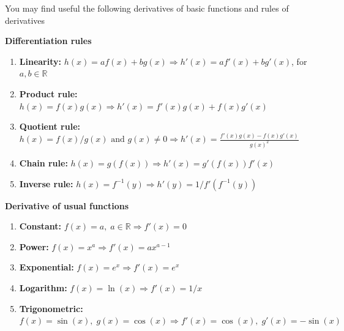 \documentclass[11pt]{exam}
\newcommand{\R}{\mathbb{R}} %
\begin{document}
\newpage
\begin{center}
You may find useful the following derivatives of basic functions and rules of derivatives
\end{center}

\begin{center}
    \textbf{Differentiation rules}
\end{center}
        
        \begin{enumerate}[leftmargin = 0.5cm, label = , rightmargin = 0.2cm]

        \item \textbf{Linearity:} $h(x) = a f(x) + b g(x) \Longrightarrow h'(x) = a f'(x) + b g'(x)$, for $a, b \in\R$

        \item \textbf{Product rule:} $h(x) = f(x)g(x) \Longrightarrow h'(x) = f'(x)g(x) + f(x)g'(x)$

        \item \textbf{Quotient rule:} $h(x) = f(x)/g(x) \text{ and } g(x) \neq 0 \Longrightarrow h'(x) = \frac{f'(x)g(x) - f(x)g'(x)}{g(x)^2}$

        \item \textbf{Chain rule:} $h(x) = g(f(x)) \Longrightarrow h'(x) = g'(f(x))f'(x)$

        \item \textbf{Inverse rule:} $h(x) = f^{-1}(y) \Longrightarrow h'(y) = 1/f'(f^{-1}(y))$
        
        \end{enumerate}

\begin{center}
    \textbf{Derivative of usual functions}
\end{center}

        \begin{enumerate}[leftmargin = 0.5cm, label = , rightmargin = 0.2cm]

        \item \textbf{Constant:} $f(x) = a,\; a \in\R \Longrightarrow f'(x) = 0$
        
        \item \textbf{Power:} $f(x) = x^a \Longrightarrow f'(x) = a x^{a-1}$
        

        \item \textbf{Exponential:} $f(x) = e^x \Longrightarrow f'(x) = e^x$

        \item \textbf{Logarithm:} $f(x) = \ln(x) \Longrightarrow f'(x) = 1/x$

        \item \textbf{Trigonometric:} $f(x) = \sin(x),\; g(x) = \cos(x) \Longrightarrow f'(x) = \cos(x),\; g'(x) = -\sin(x)$
        
        \end{enumerate}
\end{document}

